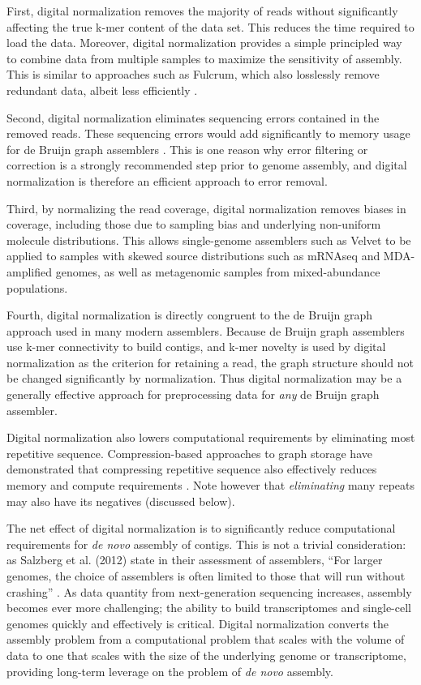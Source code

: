 \documentclass{pnastwo}
\begin{document}
\begin{article}
First, digital normalization removes the majority of reads without
significantly affecting the true k-mer content of the data set.  This
reduces the time required to load the data.  Moreover, digital
normalization provides a simple principled way to combine data from
multiple samples to maximize the sensitivity of assembly.  This is
similar to approaches such as Fulcrum, which also losslessly remove
redundant data, albeit less efficiently \cite{pubmed22419786}.

Second, digital normalization eliminates sequencing errors contained
in the removed reads.  These sequencing errors would add significantly
to memory usage for de Bruijn graph assemblers \cite{pubmed21245053}.
This is one reason why error filtering or correction is a strongly
recommended step prior to genome assembly, and digital normalization
is therefore an efficient approach to error removal.

Third, by normalizing the read coverage, digital normalization
removes biases in coverage, including those due to sampling bias and
underlying non-uniform molecule distributions.  This allows
single-genome assemblers such as Velvet to be applied to samples with
skewed source distributions such as mRNAseq and MDA-amplified genomes,
as well as metagenomic samples from mixed-abundance populations.

Fourth, digital normalization is directly congruent to the de Bruijn
graph approach used in many modern assemblers\cite{pubmed20211242}.
Because de Bruijn graph assemblers use k-mer connectivity to build
contigs, and k-mer novelty is used by digital normalization as the
criterion for retaining a read, the graph structure should not be
changed significantly by normalization.  Thus digital normalization
may be a generally effective approach for preprocessing data for {\em
  any} de Bruijn graph assembler.

Digital normalization also lowers computational requirements by
eliminating most repetitive sequence.  Compression-based approaches to
graph storage have demonstrated that compressing repetitive sequence
also effectively reduces memory and compute requirements
\cite{pubmed22139935,pubmed22156294}.
Note however that {\em eliminating} many repeats may also
have its negatives (discussed below).


The net effect of digital normalization is to significantly reduce
computational requirements for {\em de novo} assembly of contigs.
This is not a trivial consideration: as Salzberg et al. (2012) state
in their assessment of assemblers, ``For larger genomes, the choice of
assemblers is often limited to those that will run without crashing''
\cite{pubmed22147368}.  As data quantity from next-generation
sequencing increases, assembly becomes ever more challenging; the
ability to build transcriptomes and single-cell genomes quickly and
effectively is critical.  Digital normalization converts the assembly
problem from a computational problem that scales with the volume of
data to one that scales with the size of the underlying genome or
transcriptome, providing long-term leverage on the problem of {\em de
  novo} assembly.


\end{article}
\end{document}
